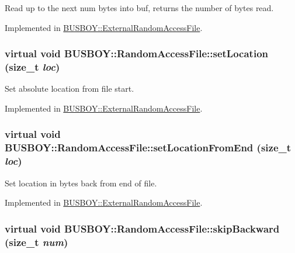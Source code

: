 Read up to the next num bytes into buf, returns the number of bytes read. 

Implemented in \hyperlink{classBUSBOY_1_1ExternalRandomAccessFile_a7dce7dc11ead8487ffba054210e3adcc}{BUSBOY::ExternalRandomAccessFile}.\hypertarget{classBUSBOY_1_1RandomAccessFile_a8b6fdc1a27e34688d73d167bfa791c30}{
\subsubsection[{setLocation}]{\setlength{\rightskip}{0pt plus 5cm}virtual void BUSBOY::RandomAccessFile::setLocation (size\_\-t {\em loc})}}
\label{classBUSBOY_1_1RandomAccessFile_a8b6fdc1a27e34688d73d167bfa791c30}


Set absolute location from file start. 

Implemented in \hyperlink{classBUSBOY_1_1ExternalRandomAccessFile_af7feababef4d36ab03b965f18928a6c2}{BUSBOY::ExternalRandomAccessFile}.\hypertarget{classBUSBOY_1_1RandomAccessFile_ae4a1cbc1c1ffc7405ef11bd9441c5f2b}{
\subsubsection[{setLocationFromEnd}]{\setlength{\rightskip}{0pt plus 5cm}virtual void BUSBOY::RandomAccessFile::setLocationFromEnd (size\_\-t {\em loc})}}
\label{classBUSBOY_1_1RandomAccessFile_ae4a1cbc1c1ffc7405ef11bd9441c5f2b}


Set location in bytes back from end of file. 

Implemented in \hyperlink{classBUSBOY_1_1ExternalRandomAccessFile_a765ea63c90b6c129f489a92750125afd}{BUSBOY::ExternalRandomAccessFile}.\hypertarget{classBUSBOY_1_1RandomAccessFile_a9026d72b47b570f79318839107068420}{
\subsubsection[{skipBackward}]{\setlength{\rightskip}{0pt plus 5cm}virtual void BUSBOY::RandomAccessFile::skipBackward (size\_\-t {\em num})}}
\label{classBUSBOY_1_1RandomAccessFile_a9026d72b47b570f79318839107068420}


